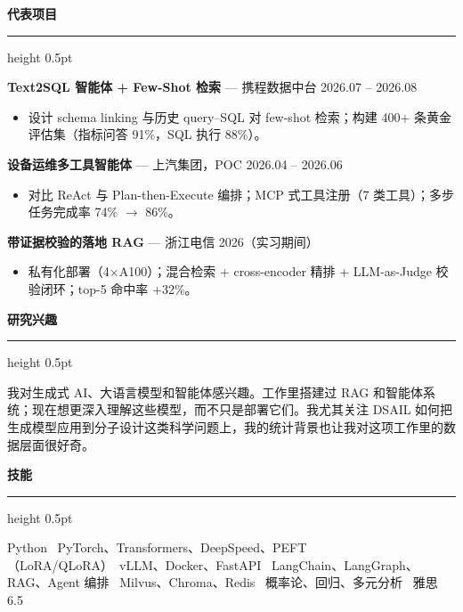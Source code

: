 \documentclass[10pt]{ctexart}
\newcommand{\sectionhead}[1]{%
  \needspace{3\baselineskip}%
  \vspace{6pt}%
  {\normalsize\bfseries #1}%
  \vspace{2pt}%
  \hrule height 0.5pt
  \vspace{3pt}%
}
\begin{document}
\sectionhead{代表项目}
\textbf{Text2SQL 智能体 + Few-Shot 检索} — 携程数据中台 \hfill 2026.07 -- 2026.08
\begin{itemize}
  \item 设计 schema linking 与历史 query--SQL 对 few-shot 检索；构建 400+ 条黄金评估集（指标问答 91\%，SQL 执行 88\%）。
\end{itemize}

\textbf{设备运维多工具智能体} — 上汽集团，POC \hfill 2026.04 -- 2026.06
\begin{itemize}
  \item 对比 ReAct 与 Plan-then-Execute 编排；MCP 式工具注册（7 类工具）；多步任务完成率 74\% $\rightarrow$ 86\%。
\end{itemize}

\textbf{带证据校验的落地 RAG} — 浙江电信 \hfill 2026（实习期间）
\begin{itemize}
  \item 私有化部署（4$\times$A100）；混合检索 + cross-encoder 精排 + LLM-as-Judge 校验闭环；top-5 命中率 +32\%。
\end{itemize}

\sectionhead{研究兴趣}
我对生成式 AI、大语言模型和智能体感兴趣。工作里搭建过 RAG 和智能体系统；现在想更深入理解这些模型，而不只是部署它们。我尤其关注 DSAIL 如何把生成模型应用到分子设计这类科学问题上，我的统计背景也让我对这项工作里的数据层面很好奇。

\sectionhead{技能}
Python \textbar\ PyTorch、Transformers、DeepSpeed、PEFT（LoRA/QLoRA）\textbar\ vLLM、Docker、FastAPI \textbar\ LangChain、LangGraph、RAG、Agent 编排 \textbar\ Milvus、Chroma、Redis \textbar\ 概率论、回归、多元分析 \textbar\ 雅思 6.5
\end{document}
